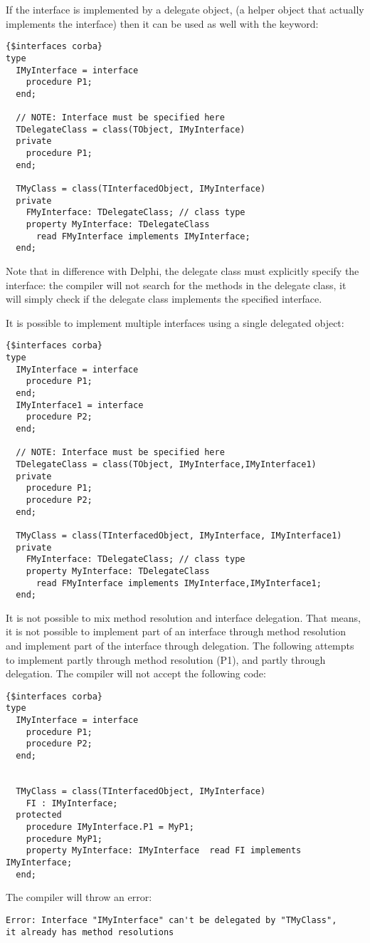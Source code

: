 If the interface is implemented by a delegate object, (a helper object that
actually implements the interface) then it can be used as well with the
 keyword:
\begin{verbatim}
{$interfaces corba}
type
  IMyInterface = interface
    procedure P1;
  end;

  // NOTE: Interface must be specified here
  TDelegateClass = class(TObject, IMyInterface)
  private
    procedure P1;
  end;
 
  TMyClass = class(TInterfacedObject, IMyInterface)
  private
    FMyInterface: TDelegateClass; // class type
    property MyInterface: TDelegateClass 
      read FMyInterface implements IMyInterface;
  end;
\end{verbatim}
Note that in difference with Delphi, the delegate class must explicitly
specify the interface: the compiler will not search for the methods in the
delegate class, it will simply check if the delegate class implements the
specified interface.

It is possible to implement multiple interfaces using a single delegated
object:
\begin{verbatim}
{$interfaces corba}
type
  IMyInterface = interface
    procedure P1;
  end;
  IMyInterface1 = interface
    procedure P2;
  end;

  // NOTE: Interface must be specified here
  TDelegateClass = class(TObject, IMyInterface,IMyInterface1)
  private
    procedure P1;
    procedure P2;
  end;

  TMyClass = class(TInterfacedObject, IMyInterface, IMyInterface1)
  private
    FMyInterface: TDelegateClass; // class type
    property MyInterface: TDelegateClass
      read FMyInterface implements IMyInterface,IMyInterface1;
  end;
\end{verbatim}

It is not possible to mix method resolution and interface delegation. 
That means, it is not possible to implement part of an interface through
method resolution and implement part of the interface through delegation. 
The following attempts to implement  partly through method
resolution (P1), and partly through delegation. The compiler will not accept
the following code:
\begin{verbatim}
{$interfaces corba}
type
  IMyInterface = interface
    procedure P1;
    procedure P2;
  end;


  TMyClass = class(TInterfacedObject, IMyInterface)
    FI : IMyInterface; 
  protected
    procedure IMyInterface.P1 = MyP1;
    procedure MyP1;
    property MyInterface: IMyInterface  read FI implements IMyInterface;
  end;
\end{verbatim}
The compiler will throw an error:
\begin{verbatim}
Error: Interface "IMyInterface" can't be delegated by "TMyClass", 
it already has method resolutions
\end{verbatim}

